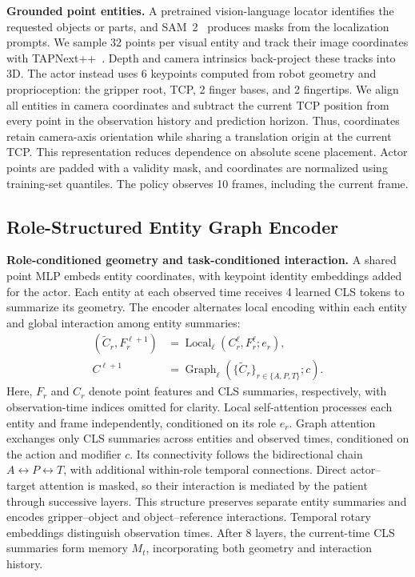 \textbf{Grounded point entities.}
A pretrained vision-language locator identifies the requested objects or parts, and SAM~2~\cite{ravi2024sam2} produces masks from the localization prompts.
We sample 32 points per visual entity and track their image coordinates with TAPNext++~\cite{jung2026tapnextpp}.
Depth and camera intrinsics back-project these tracks into 3D.
The actor instead uses 6 keypoints computed from robot geometry and proprioception: the gripper root, TCP, 2 finger bases, and 2 fingertips.
We align all entities in camera coordinates and subtract the current TCP position from every point in the observation history and prediction horizon.
Thus, coordinates retain camera-axis orientation while sharing a translation origin at the current TCP.
This representation reduces dependence on absolute scene placement.
Actor points are padded with a validity mask, and coordinates are normalized using training-set quantiles.
The policy observes 10 frames, including the current frame.

\subsection{Role-Structured Entity Graph Encoder}
\textbf{Role-conditioned geometry and task-conditioned interaction.}
A shared point MLP embeds entity coordinates, with keypoint identity embeddings added for the actor.
Each entity at each observed time receives 4 learned CLS tokens to summarize its geometry.
The encoder alternates local encoding within each entity and global interaction among entity summaries:
\begin{equation}
\begin{aligned}
    (\widetilde C_r,F_r^{\ell+1})
       &=\operatorname{Local}_{\ell}(C_r^\ell,F_r^\ell;e_r),\\
    C^{\ell+1}
       &=\operatorname{Graph}_{\ell}(\{\widetilde C_r\}_{r\in\{A,P,T\}};c).
\end{aligned}
\label{eq:encoder}
\end{equation}
Here, $F_r$ and $C_r$ denote point features and CLS summaries, respectively, with observation-time indices omitted for clarity.
Local self-attention processes each entity and frame independently, conditioned on its role $e_r$.
Graph attention exchanges only CLS summaries across entities and observed times, conditioned on the action and modifier $c$.
Its connectivity follows the bidirectional chain $A\leftrightarrow P\leftrightarrow T$, with additional within-role temporal connections.
Direct actor--target attention is masked, so their interaction is mediated by the patient through successive layers.
This structure preserves separate entity summaries and encodes gripper--object and object--reference interactions.
Temporal rotary embeddings distinguish observation times.
After 8 layers, the current-time CLS summaries form memory $M_t$, incorporating both geometry and interaction history.

